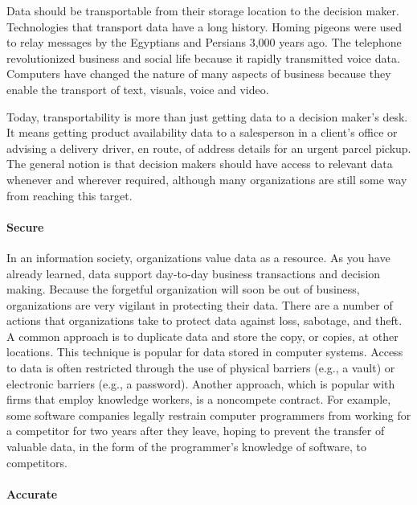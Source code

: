 \documentclass[
]{article}
\begin{document}
Data should be transportable from their storage location to the decision
maker. Technologies that transport data have a long history. Homing
pigeons were used to relay messages by the Egyptians and Persians 3,000
years ago. The telephone revolutionized business and social life because
it rapidly transmitted voice data. Computers have changed the nature of
many aspects of business because they enable the transport of text,
visuals, voice and video.

Today, transportability is more than just getting data to a decision
maker's desk. It means getting product availability data to a
salesperson in a client's office or advising a delivery driver, en
route, of address details for an urgent parcel pickup. The general
notion is that decision makers should have access to relevant data
whenever and wherever required, although many organizations are still
some way from reaching this target.

\hypertarget{secure}{%
\paragraph*{Secure}\label{secure}}

In an information society, organizations value data as a resource. As
you have already learned, data support day-to-day business transactions
and decision making. Because the forgetful organization will soon be out
of business, organizations are very vigilant in protecting their data.
There are a number of actions that organizations take to protect data
against loss, sabotage, and theft. A common approach is to duplicate
data and store the copy, or copies, at other locations. This technique
is popular for data stored in computer systems. Access to data is often
restricted through the use of physical barriers (e.g., a vault) or
electronic barriers (e.g., a password). Another approach, which is
popular with firms that employ knowledge workers, is a noncompete
contract. For example, some software companies legally restrain computer
programmers from working for a competitor for two years after they
leave, hoping to prevent the transfer of valuable data, in the form of
the programmer's knowledge of software, to competitors.

\hypertarget{accurate}{%
\paragraph*{Accurate}\label{accurate}}
\end{document}
